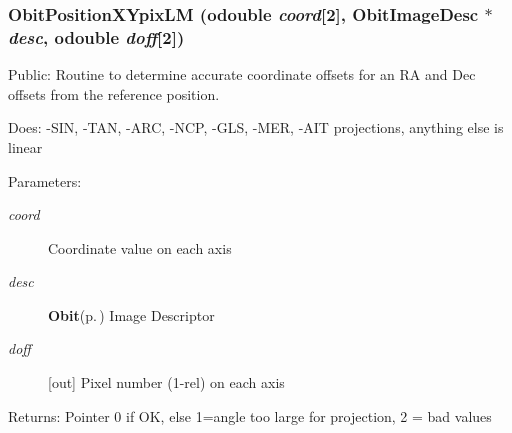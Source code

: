 \subsubsection{ Obit\-Position\-XYpix\-LM ({\bf odouble} {\em coord}[2], {\bf Obit\-Image\-Desc} $\ast$ {\em desc}, {\bf odouble} {\em doff}[2])}\label{ObitPosition_8c_a3}


Public: Routine to determine accurate coordinate offsets for an RA and Dec offsets from the reference position. 

Does: -SIN, -TAN, -ARC, -NCP, -GLS, -MER, -AIT projections, anything else is linear

\begin{Desc}
\item[Parameters:]
\begin{description}
\item[{\em coord}]Coordinate value on each axis \item[{\em desc}]{\bf Obit}{\rm (p.\,\pageref{structObit})} Image Descriptor \item[{\em doff}][out] Pixel number (1-rel) on each axis \end{description}
\end{Desc}
\begin{Desc}
\item[Returns:]Pointer 0 if OK, else 1=angle too large for projection, 2 = bad values \end{Desc}
